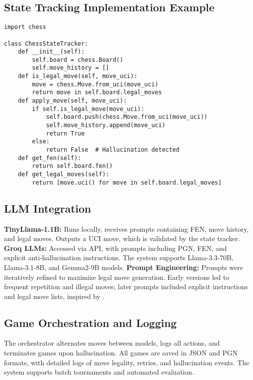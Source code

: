 \documentclass[conference]{IEEEtran}
\begin{document}
\subsection{State Tracking Implementation Example}
\begin{lstlisting}[caption={Core logic of state tracking and move validation},label={lst:state-tracking}]
import chess

class ChessStateTracker:
    def __init__(self):
        self.board = chess.Board()
        self.move_history = []
    def is_legal_move(self, move_uci):
        move = chess.Move.from_uci(move_uci)
        return move in self.board.legal_moves
    def apply_move(self, move_uci):
        if self.is_legal_move(move_uci):
            self.board.push(chess.Move.from_uci(move_uci))
            self.move_history.append(move_uci)
            return True
        else:
            return False  # Hallucination detected
    def get_fen(self):
        return self.board.fen()
    def get_legal_moves(self):
        return [move.uci() for move in self.board.legal_moves]
\end{lstlisting}

\subsection{LLM Integration}
\textbf{TinyLlama-1.1B:} Runs locally, receives prompts containing FEN, move history, and legal moves. Outputs a UCI move, which is validated by the state tracker.\newline
\textbf{Groq LLMs:} Accessed via API, with prompts including PGN, FEN, and explicit anti-hallucination instructions. The system supports Llama-3.3-70B, Llama-3.1-8B, and Gemma2-9B models.\newline
\textbf{Prompt Engineering:} Prompts were iteratively refined to maximize legal move generation. Early versions led to frequent repetition and illegal moves; later prompts included explicit instructions and legal move lists, inspired by \cite{llm_constrained_decoding, llm_chess_hybrid_systems, llm_reasoning}.

\subsection{Game Orchestration and Logging}
The orchestrator alternates moves between models, logs all actions, and terminates games upon hallucination. All games are saved in JSON and PGN formats, with detailed logs of move legality, retries, and hallucination events. The system supports batch tournaments and automated evaluation.
\end{document}

